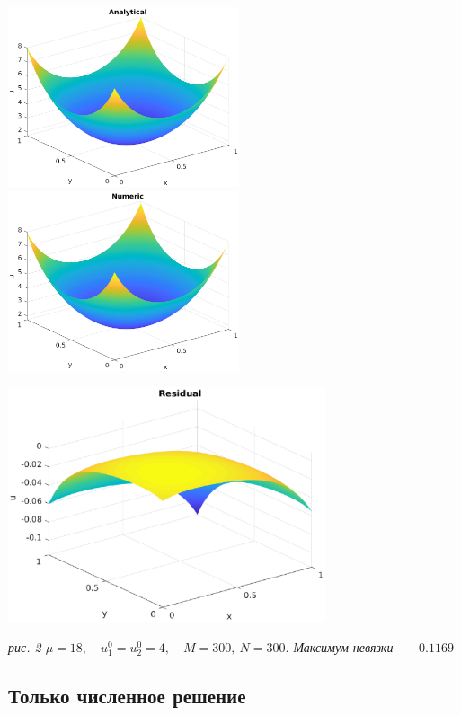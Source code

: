 \documentclass[12pt, a4paper]{article} %
\begin{document}
\newpage 

\noindent
\includegraphics[width=0.51\textwidth]{2_a.eps}
\includegraphics[width=0.51\textwidth]{2_n.eps}
\begin{center}
\includegraphics[width=0.7\textwidth]{2_r.eps}

\it{рис. 2 \quad $\mu = 18, \quad u_1^0 = u_2^0 = 4, \quad M = 300,\ N = 300.$ Максимум невязки~---~$0.1169$}
\end{center}

\newpage 

\subsection{Только численное решение}
\end{document}
